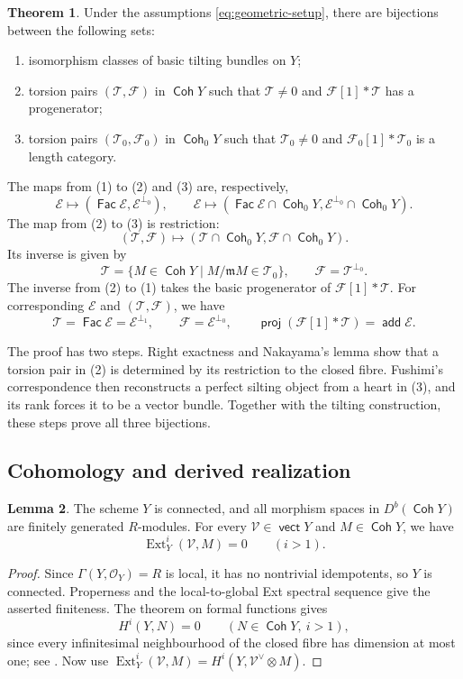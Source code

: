 \documentclass[a4paper,reqno]{amsart}
\def\E{\mathcal{E}}
\def\F{\mathcal{F}}
\def\O{\mathcal{O}}
\def\T{\mathcal{T}}
\def\V{\mathcal{V}}
\def\m{\mathfrak{m}}
\DeclareMathOperator{\proj}{\mathsf{proj}}
\DeclareMathOperator{\add}{\mathsf{add}}
\DeclareMathOperator{\Fac}{\mathsf{Fac}}
\DeclareMathOperator{\Coh}{\mathsf{Coh}}
\DeclareMathOperator{\vect}{\mathsf{vect}}
\DeclareMathOperator{\Ext}{Ext}
\theoremstyle{definition}
\newtheorem{Thm}{Theorem}[section]
\newtheorem{Lem}[Thm]{Lemma}
\begin{document}
\begin{Thm}\label{thm:tilting-torsion}
Under the assumptions \eqref{eq:geometric-setup}, there are bijections between the following sets:
\begin{enumerate}
\item isomorphism classes of basic tilting bundles on $Y$;
\item torsion pairs $(\T,\F)$ in $\Coh Y$ such that $\T\ne0$ and $\F[1]*\T$ has a progenerator;
\item torsion pairs $(\T_0,\F_0)$ in $\Coh_0Y$ such that $\T_0\ne0$ and $\F_0[1]*\T_0$ is a length category.
\end{enumerate}
The maps from (1) to (2) and (3) are, respectively,
\[
\E\longmapsto(\Fac\E,\E^{\perp_0}),
\qquad
\E\longmapsto(\Fac\E\cap\Coh_0Y,\E^{\perp_0}\cap\Coh_0Y).
\]
The map from (2) to (3) is restriction:
\[
(\T,\F)\longmapsto(\T\cap\Coh_0Y,\F\cap\Coh_0Y).
\]
Its inverse is given by
\begin{equation}\label{eq:recover-torsion-class}
\T=\{M\in\Coh Y\mid M/\m M\in\T_0\},
\qquad\F=\T^{\perp_0}.
\end{equation}
The inverse from (2) to (1) takes the basic progenerator of $\F[1]*\T$. For corresponding $\E$ and $(\T,\F)$, we have
\[
\T=\Fac\E=\E^{\perp_1},\qquad
\F=\E^{\perp_0},\qquad
\proj(\F[1]*\T)=\add\E.
\]
\end{Thm}

The proof has two steps. Right exactness and Nakayama's lemma show that a torsion pair in (2) is determined by its restriction to the closed fibre. Fushimi's correspondence then reconstructs a perfect silting object from a heart in (3), and its rank forces it to be a vector bundle. Together with the tilting construction, these steps prove all three bijections.

\subsection{Cohomology and derived realization}\label{sec:derived-restrictions}

\begin{Lem}\label{lem:cohomological-dimension-one}
The scheme $Y$ is connected, and all morphism spaces in $D^b(\Coh Y)$ are finitely generated $R$-modules. For every $\V\in\vect Y$ and $M\in\Coh Y$, we have
\[
\Ext_Y^i(\V,M)=0\qquad(i>1).
\]
\end{Lem}
\begin{proof}
Since $\Gamma(Y,\O_Y)=R$ is local, it has no nontrivial idempotents, so $Y$ is connected. Properness and the local-to-global Ext spectral sequence give the asserted finiteness. The theorem on formal functions gives
\[
H^i(Y,N)=0\qquad(N\in\Coh Y,\ i>1),
\]
since every infinitesimal neighbourhood of the closed fibre has dimension at most one; see \cite[Tag 02V7]{stacks-project}. Now use $\Ext_Y^i(\V,M)=H^i(Y,\V^\vee\otimes M)$.
\end{proof}
\end{document}
